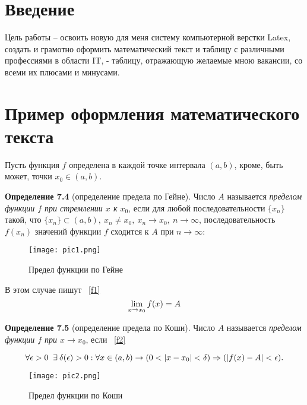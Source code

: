 \section*{Введение}
Цель работы – освоить новую для меня систему компьютерной верстки Latex, создать и грамотно оформить математический текст и таблицу с различными профессиями в области IT, - таблицу, отражающую желаемые мною вакансии, со всеми их плюсами и минусами.


\newpage
\section{Пример оформления математического текста}
Пусть функция $f$ определена в каждой точке интервала $(a, b)$, кроме, быть может, точки $x_0 \in (a, b)$.

\textbf {Определение 7.4} (определение предела по Гейне).
Число $A$ называется \textit{ пределом функции $f$ при стремлении
$x$ к $x_0$}, если для любой последовательности $\{x_n\}$ такой, что
$\{x_n\} \subset (a, b), \: x_n \neq x_0, \: x_n \rightarrow x_0, \: n \rightarrow \infty$, последовательность $f(x_n)$ значений функции $f$ сходится к $A$ при $n \rightarrow \infty$:

\begin{figure}[H]
\centerline{\texttt{[image: pic1.png]}}
\caption{Предел функции по Гейне}
\end{figure}

В этом случае пишут ~\eqref{f1}
\begin{equation}
\label{f1}
\centering
\lim_{x\to x_0} f(x)=A
\end{equation}

\textbf{Определение 7.5} (определение предела по Коши).
Число $A$ называется \textit{пределом функции $f$ при $x \rightarrow x_0$}, если ~\eqref{f2}

\begin{equation}
\label{f2}
\centering
\forall \epsilon >0 \; \; \exists \: \delta (\epsilon) >0 : \forall x \in (a,b) \rightarrow (0<|x-x_0|<\delta) \Rightarrow (|f(x)-A|<\epsilon).
\end{equation}

\begin{figure}[H]
\centerline{\texttt{[image: pic2.png]}}
\caption{Предел функции по Коши}
\end{figure}

